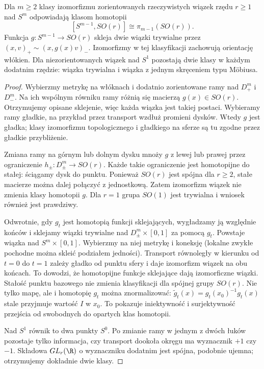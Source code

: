 \begin{twierdzenie}
\label{thm:clutching-16}
Dla $m\geq2$ klasy izomorfizmu zorientowanych
rzeczywistych wiązek
rzędu $r\geq1$ nad $S^m$
odpowiadają klasom homotopii
\[
 [S^{m-1},SO(r)]
 \cong\pi_{m-1}(SO(r)).
\]
Funkcja $g:S^{m-1}\to SO(r)$
skleja dwie wiązki
trywialne przez
$(x,v)_+\sim(x,g(x)v)_-$.
Izomorfizmy w tej klasyfikacji zachowują orientację włókien.
Dla niezorientowanych
wiązek nad $S^1$ pozostają
dwie klasy w każdym dodatnim
rzędzie: wiązka trywialna
i wiązka z jednym skręceniem
typu Möbiusa.
\end{twierdzenie}
\begin{proof}
Wybierzmy metrykę na włóknach
i dodatnio zorientowane ramy
nad $D^m_+$ i $D^m_-$.
Na ich wspólnym równiku
ramy różnią się macierzą
$g(x)\in SO(r)$. Otrzymujemy
opisane sklejenie, więc
każda wiązka jest takiej
postaci. Wybieramy ramy gładkie, na przykład przez transport
wzdłuż promieni dysków. Wtedy $g$ jest gładka;
klasy izomorfizmu
topologicznego i gładkiego
na sferze są tu zgodne
przez gładkie przybliżenie.

Zmiana ramy na górnym
lub dolnym dysku mnoży
$g$ z lewej lub prawej
przez ograniczenie
$h_\pm:D^m_\pm\to SO(r)$.
Każde takie ograniczenie
jest homotopijne do stałej:
ściągamy dysk do punktu.
Ponieważ $SO(r)$ jest
spójna dla $r\geq2$,
stałe macierze można
dalej połączyć z
jednostkową. Zatem
izomorfizm wiązek
nie zmienia klasy
homotopii $g$.
Dla $r=1$ grupa $SO(1)$
jest trywialna i wniosek
również jest prawdziwy.

Odwrotnie, gdy $g_t$ jest homotopią funkcji
sklejających, wygładzamy ją względnie końców i sklejamy
wiązki trywialne nad
$D^m_\pm\times[0,1]$
za pomocą $g_t$.
Powstaje wiązka nad
$S^m\times[0,1]$.
Wybierzmy na niej
metrykę i koneksję
(lokalne zwykłe pochodne
można skleić podziałem
jedności). Transport
równoległy w kierunku
od $t=0$ do $t=1$
zależy gładko od punktu
sfery i daje izomorfizm
wiązek na obu końcach.
To dowodzi, że homotopijne
funkcje sklejające
dają izomorficzne wiązki.
Stałość punktu bazowego
nie zmienia klasyfikacji dla spójnej grupy $SO(r)$.
Nie tylko mapę, ale i homotopię $g_t$ można
znormalizować: $\widetilde g_t(x)=g_t(x_0)^{-1}g_t(x)$
stale przyjmuje wartość $I$ w $x_0$. To pokazuje
iniektywność i surjektywność przejścia od swobodnych
do opartych klas homotopii.

Nad $S^1$ równik to
dwa punkty $S^0$.
Po zmianie ramy w
jednym z dwóch łuków
pozostaje tylko informacja,
czy transport dookoła
okręgu ma wyznacznik
$+1$ czy $-1$.
Składowa $GL_r(\R)$
o wyznaczniku dodatnim
jest spójna, podobnie
ujemna; otrzymujemy
dokładnie dwie klasy.
\end{proof}


